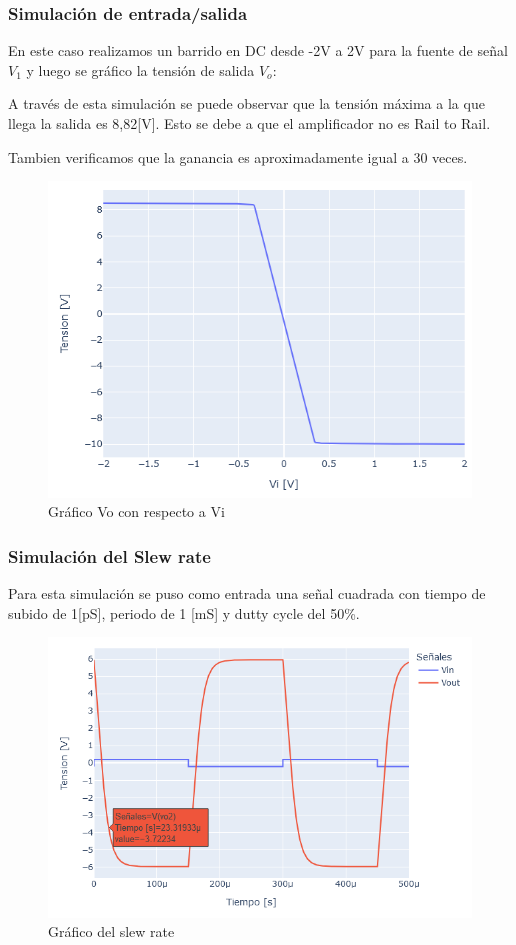\subsubsection{Simulación de entrada/salida}

En este caso realizamos un barrido en DC desde -2V a 2V para la fuente de señal $V_1$ y luego se gráfico la tensión de salida $V_o$:

A través de esta simulación se puede observar que la tensión máxima a la que llega la salida es 8,82[V]. Esto se debe a que el amplificador no es Rail to Rail. 

Tambien verificamos que la ganancia es aproximadamente igual a 30 veces.

\begin{figure}[h!]
    \centering
    \includegraphics[width=0.80\linewidth]{img/TP2_2_grafico_entrada_salida.png}
    \caption{Gráfico Vo con respecto a Vi}
    \label{fig:vo_vi}
\end{figure}

\vspace{1em}

\subsubsection{Simulación del Slew rate }

Para esta simulación se puso como entrada una señal cuadrada con tiempo de subido de 1[pS], periodo de 1 [mS] y dutty cycle del 50\%. 

\begin{figure}[h!]
    \centering
    \includegraphics[width=0.90\linewidth]{img/TP2_2_grafico_slew.png}
    \caption{Gráfico del slew rate}
    \label{fig:1b_slew_rate}
\end{figure}


